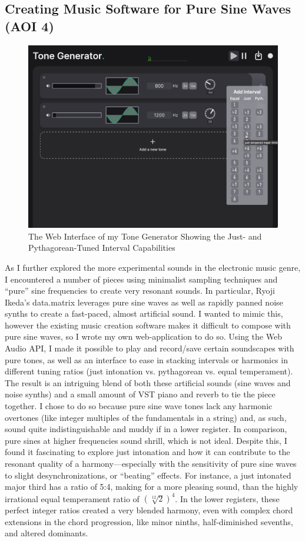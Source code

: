 \documentclass[12pt]{article}
\begin{document}
\subsection{Creating Music Software for Pure Sine Waves (AOI 4)}
\begin{figure}[H]
\centering
\includegraphics[width=0.85\linewidth]{tone gen ui}
\caption{The Web Interface of my Tone Generator Showing the Just- and Pythagorean-Tuned Interval Capabilities}
\label{fig:ui}
\end{figure}

As I further explored the more experimental sounds in the electronic music genre, I encountered a number of pieces using minimalist sampling techniques and “pure” sine frequencies to create very resonant sounds. In particular, Ryoji Ikeda’s data.matrix leverages pure sine waves as well as rapidly panned noise synths to create a fast-paced, almost artificial sound. I wanted to mimic this, however the existing music creation software makes it difficult to compose with pure sine waves, so I wrote my own web-application to do so. Using the Web Audio API,\autocite{webapi} I made it possible to play and record/save certain soundscapes with pure tones, as well as an interface to ease in stacking intervals or harmonics in different tuning ratios (just intonation vs. pythagorean vs. equal temperament). The result is an intriguing blend of both these artificial sounds (sine waves and noise synths) and a small amount of VST piano and reverb to tie the piece together. I chose to do so because pure sine wave tones lack any harmonic overtones (like integer multiples of the fundamentals in a string) and, as such, sound quite indistinguishable and muddy if in a lower register. In comparison, pure sines at higher frequencies sound shrill, which is not ideal. Despite this, I found it fascinating to explore just intonation and how it can contribute to the resonant quality of a harmony—especially with the sensitivity of pure sine waves to slight desynchronizations, or “beating” effects. For instance, a just intonated major third has a ratio of 5:4, making for a more pleasing sound, than the highly irrational equal temperament ratio of $(\sqrt[12]{2})^4$. In the lower registers, these perfect integer ratios created a very blended harmony, even with complex chord extensions in the chord progression, like minor ninths, half-diminished sevenths, and altered dominants.
\end{document}
